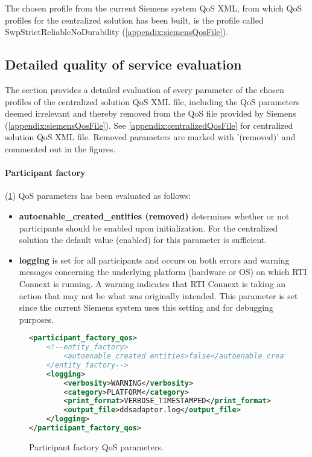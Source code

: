 The chosen profile from the current Siemens system QoS XML, from which QoS profiles for the centralized solution has been built, is the profile called SwpStrictReliableNoDurability (\cref{appendix:siemensQosFile}).


\subsection{Detailed quality of service evaluation} \label{sec:detailedQoSDesc}

The section provides a detailed evaluation of every parameter of the chosen profiles of the centralized solution QoS XML file, including the QoS parameters deemed irrelevant and thereby removed from the QoS file provided by Siemens (\cref{appendix:siemensQosFile}). See \cref{appendix:centralizedQosFile} for centralized solution QoS XML file. Removed parameters are marked with '(removed)' and commented out in the figures.

\paragraph{Participant factory} (\cref{fig:parFacQos}) QoS parameters has been evaluated as follows:

\begin{itemize}
	\item \textbf{autoenable\_created\_entities (removed)} determines whether or not participants should be enabled upon initialization. For the centralized solution the default value (enabled) for this parameter is sufficient.
	\item \textbf{logging} is set for all participants and occurs on both errors and warning messages concerning the underlying platform (hardware or OS) on which RTI Connext is running. A warning indicates that RTI Connext is taking an action that may not be what was originally intended. This parameter is set since the current Siemens system uses this setting and for debugging purposes.
\end{itemize}

\begin{figure}
\begin{lstlisting}[language=XML]
<participant_factory_qos>
	<!--entity_factory>
		<autoenable_created_entities>false</autoenable_created_entities>
	</entity_factory-->
	<logging>
		<verbosity>WARNING</verbosity>
		<category>PLATFORM</category>
		<print_format>VERBOSE_TIMESTAMPED</print_format>
		<output_file>ddsadaptor.log</output_file>
	</logging>
</participant_factory_qos>
\end{lstlisting}
\caption[Participant factory QoS parameters]{
		\label{fig:parFacQos} 
		\footnotesize{Participant factory QoS parameters.}
	}
\end{figure}

